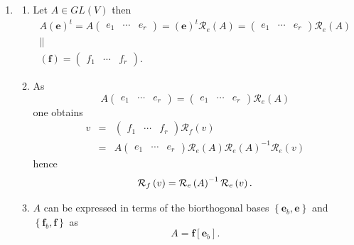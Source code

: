\documentclass[aps,preprint]{revtex4}
\begin{document}
\begin{enumerate}
\item 
\begin{enumerate}
\item Let $A\in GL\left( V\right) $ then 
\begin{gather}
A\left( \boldsymbol{e}\right) ^{t}=A\left( 
\begin{array}{ccc}
e_{1} & \cdots & e_{r}%
\end{array}%
\right) =\left( \boldsymbol{e}\right) ^{t}\mathcal{R}_{e}\left( A\right)
=\left( 
\begin{array}{ccc}
e_{1} & \cdots & e_{r}%
\end{array}%
\right) \mathcal{R}_{e}\left( A\right) \\
\parallel \\
\left( \boldsymbol{f}\right) =\left( 
\begin{array}{ccc}
f_{1} & \cdots & f_{r}%
\end{array}%
\right) .
\end{gather}

\item As 
\begin{equation}
A\left( 
\begin{array}{ccc}
e_{1} & \cdots & e_{r}%
\end{array}%
\right) =\left( 
\begin{array}{ccc}
e_{1} & \cdots & e_{r}%
\end{array}%
\right) \mathcal{R}_{e}\left( A\right)
\end{equation}%
one obtains 
\begin{eqnarray}
v &=&\left( 
\begin{array}{ccc}
f_{1} & \cdots & f_{r}%
\end{array}%
\right) \mathcal{R}_{f}\left( v\right) \\
&=&A\left( 
\begin{array}{ccc}
e_{1} & \cdots & e_{r}%
\end{array}%
\right) \mathcal{R}_{e}\left( A\right) \mathcal{R}_{e}\left( A\right) ^{-1}%
\mathcal{R}_{e}\left( v\right)
\end{eqnarray}%
hence 
\begin{equation}
\mathcal{R}_{f}\left( v\right) =\mathcal{R}_{e}\left( A\right) ^{-1}\mathcal{%
R}_{e}\left( v\right) .
\end{equation}

\item $A$ can be expressed in terms of the biorthogonal bases $\left\{ 
\boldsymbol{e}_{b}\boldsymbol{,e}\right\} $ and $\left\{ \boldsymbol{f}_{b}%
\boldsymbol{,f}\right\} $ as 
\begin{equation}
A=\boldsymbol{f}\left[ \boldsymbol{e}_{b}\right] .
\end{equation}


\end{enumerate}
\end{enumerate}
\end{document}
